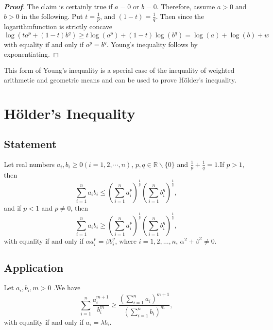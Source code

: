 \documentclass[a4paper]{report}
\begin{document}
\begin{proof}[\bf{Proof}]

The claim is certainly true if  $a = 0$ or $b = 0$. Therefore, assume $a>0$ and $b>0$ in the following.  Put $t =\frac{1}{p}$, and $(1-t) = \frac{1}{q}$. Then since the logarithmfunction is strictly concave
\[\log \left(t a^p +(1-t) b^q \right) \geqslant t \log  \left( a^p\right) + (1-t) \log\left(b^q\right)=\log(a)+\log(b)+w\]
with equality if and only if $a^p = b^q$. Young's inequality follows by exponentiating.
\end{proof}

This form of Young's inequality is a special case of the inequality of weighted arithmetic and geometric means and can be used to prove H\"{o}lder's inequality.


\chapter{H\"{o}lder's Inequality}
\section{Statement}
    \begin{thr}
    	Let real numbers $a_i,b_i\geqslant0(i=1,2,\cdots ,n)$, $p,q\in\mathbb{R}\backslash\{0\}$ and $\displaystyle\frac{1}{p}+\frac{1}{q}=1$.\linebreak If $p>1$, then
    	\begin{equation}
    	\sum_{i=1}^{n}a_ib_i\leqslant
    	\left(\sum_{i=1}^{n}a_i^p\right)^{\frac{1}{p}}
    	\left(\sum_{i=1}^{n}b_i^q\right)^{\frac{1}{q}},
    	\end{equation}  
     and if $p<1$ and $p\neq0$, then
    	\begin{equation}
    	\sum_{i=1}^{n}a_ib_i\geqslant
    	\left(\sum_{i=1}^{n}a_i^p\right)^{\frac{1}{p}}
    	\left(\sum_{i=1}^{n}b_i^q\right)^{\frac{1}{q}},
    	\end{equation} 
with equality if and only if $\alpha a_i^p=\beta b_i^q$, where $i=1,2,\dotso ,n$, $\alpha^2+\beta^2\neq0$.
    \end{thr}
\par\;
\section{Application}
   \begin{myex}
   Let $a_i,b_i,m>0$ .We have
  \begin{equation}
  \sum_{i=1}^n \frac{a_i^{m+1}}{b_i^m}\geqslant\frac{\left(\displaystyle\sum_{i=1}^n a_i\right)^{m+1}}{\left(\displaystyle\sum_{i=1}^n b_i\right)^{m}},
  \end{equation} 
with equality if and only if $a_i=\lambda b_i$.
\end{myex}
\end{document}
